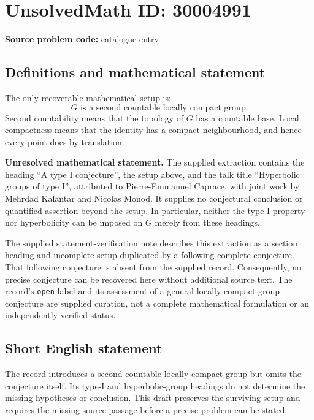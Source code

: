 \documentclass[11pt]{article}
\begin{document}
\section*{UnsolvedMath ID: 30004991}
\textbf{Source problem code:} catalogue entry
\subsection{Definitions and mathematical statement}
The only recoverable mathematical setup is:
\[
G\text{ is a second countable locally compact group.}
\]
Second countability means that the topology of \(G\) has a countable base. Local compactness means that the identity has a compact neighbourhood, and hence every point does by translation.

\textbf{Unresolved mathematical statement.} The supplied extraction contains the heading ``A type I conjecture'', the setup above, and the talk title ``Hyperbolic groups of type I'', attributed to Pierre-Emmanuel Caprace, with joint work by Mehrdad Kalantar and Nicolas Monod. It supplies no conjectural conclusion or quantified assertion beyond the setup. In particular, neither the type-I property nor hyperbolicity can be imposed on \(G\) merely from these headings.

The supplied statement-verification note describes this extraction as a section heading and incomplete setup duplicated by a following complete conjecture. That following conjecture is absent from the supplied record. Consequently, no precise conjecture can be recovered here without additional source text. The record's \texttt{open} label and its assessment of a general locally compact-group conjecture are supplied curation, not a complete mathematical formulation or an independently verified status.
\subsection{Short English statement}
The record introduces a second countable locally compact group but omits the conjecture itself. Its type-I and hyperbolic-group headings do not determine the missing hypotheses or conclusion. This draft preserves the surviving setup and requires the missing source passage before a precise problem can be stated.
\end{document}
